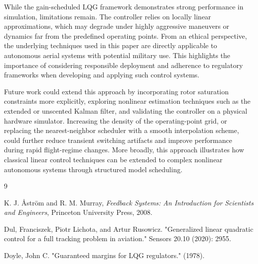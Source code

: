 \documentclass[11pt]{amsart}
\begin{document}
While the gain-scheduled LQG framework demonstrates strong performance in simulation, limitations remain. The controller relies on locally linear approximations, which may degrade under highly aggressive maneuvers or dynamics far from the predefined operating points. From an ethical perspective, the underlying techniques used in this paper are directly applicable to autonomous aerial systems with potential military use. This highlights the importance of considering responsible deployment and adherence to regulatory frameworks when developing and applying such control systems.

Future work could extend this approach by incorporating rotor saturation constraints more explicitly, exploring nonlinear estimation techniques such as the extended or unscented Kalman filter, and validating the controller on a physical hardware simulator. Increasing the density of the operating-point grid, or replacing the nearest-neighbor scheduler with a smooth interpolation scheme, could further reduce transient switching artifacts and improve performance during rapid flight-regime changes. More broadly, this approach illustrates how classical linear control techniques can be extended to complex nonlinear autonomous systems through structured model scheduling.







\FloatBarrier %
\newpage

\begin{thebibliography}{9}

K. J. Åström and R. M. Murray,
\textit{Feedback Systems: An Introduction for Scientists and Engineers},
Princeton University Press, 2008.

\bibitem{}
Dul, Franciszek, Piotr Lichota, and Artur Rusowicz. "Generalized linear quadratic control for a full tracking problem in aviation." Sensors 20.10 (2020): 2955.

\bibitem{}
Doyle, John C. "Guaranteed margins for LQG regulators." (1978).

\end{thebibliography}

\end{document}
